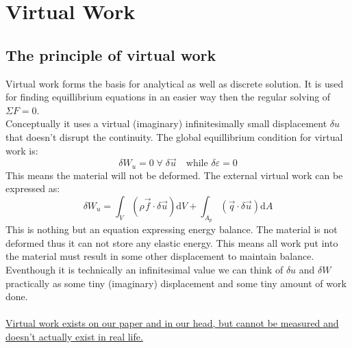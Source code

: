 \documentclass[11pt, a4paper]{article}
\renewcommand*{\epsilon}{\varepsilon}
\renewcommand*{\d}{\text{d}}
\numberwithin{equation}{section}
\numberwithin{figure}{section}
\begin{document}
\setcounter{section}{4}
\section{Virtual Work}

\subsection{The principle of virtual work}
Virtual work forms the basis for analytical as well as discrete solution. It is used for finding equillibrium equations in an easier way then the regular solving of $\Sigma F=0$.\\
Conceptually it uses a virtual (imaginary) infinitesimally small displacement $\delta u$ that doesn't disrupt the continuity. The global equillibrium condition for virtual work is:
\begin{equation}
  \delta W_u = 0\; \forall \; \delta\vec{u} \quad \text{while } \delta\epsilon=0
\end{equation}
This means the material will not be deformed. The external virtual work can be expressed as:
\begin{equation}
  \delta W_u = \int_V \left( \rho \vec{f} \cdot \delta\vec{u}\right)\d V + \int_{A_p} \left( \vec{q} \cdot \delta\vec{u} \right)\d A
\end{equation}
This is nothing but an equation expressing energy balance. The material is not deformed thus it can not store any elastic energy. This means all work put into the material must result in some other displacement to maintain balance. Eventhough it is technically an infinitesimal value we can think of $\delta u$ and $\delta W$ practically as some tiny (imaginary) displacement and some tiny amount of work done.\\
\\
\underline{Virtual work exists on our paper and in our head, but cannot be measured and doesn't actually exist in real life.}\\
\end{document}
